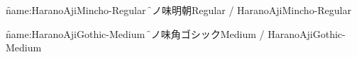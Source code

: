

\nopagenumbers

\font\f{name:HaranoAjiMincho-Regular} \f
原ノ味明朝Regular / HaranoAjiMincho-Regular

\font\f{name:HaranoAjiGothic-Medium} \f
原ノ味角ゴシックMedium / HaranoAjiGothic-Medium

\bye
